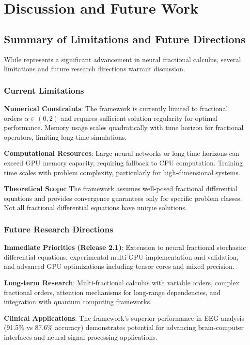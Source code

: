 \section{Discussion and Future Work}

\subsection{Summary of Limitations and Future Directions}

While \hpfracc represents a significant advancement in neural fractional calculus, several limitations and future research directions warrant discussion.

\subsubsection{Current Limitations}

\textbf{Numerical Constraints}: The framework is currently limited to fractional orders $\alpha \in (0, 2)$ and requires sufficient solution regularity for optimal performance. Memory usage scales quadratically with time horizon for fractional operators, limiting long-time simulations.

\textbf{Computational Resources}: Large neural networks or long time horizons can exceed GPU memory capacity, requiring fallback to CPU computation. Training time scales with problem complexity, particularly for high-dimensional systems.

\textbf{Theoretical Scope}: The framework assumes well-posed fractional differential equations and provides convergence guarantees only for specific problem classes. Not all fractional differential equations have unique solutions.

\subsubsection{Future Research Directions}

\textbf{Immediate Priorities (Release 2.1)}: Extension to neural fractional stochastic differential equations, experimental multi-GPU implementation and validation, and advanced GPU optimizations including tensor cores and mixed precision.

\textbf{Long-term Research}: Multi-fractional calculus with variable orders, complex fractional orders, attention mechanisms for long-range dependencies, and integration with quantum computing frameworks.

\textbf{Clinical Applications}: The framework's superior performance in EEG analysis (91.5\% vs 87.6\% accuracy) demonstrates potential for advancing brain-computer interfaces and neural signal processing applications.


